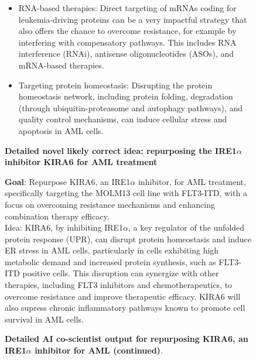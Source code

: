 \begin{figure}[htbp!]
\begin{tcolorbox}[
    colback=black!5!white,
    colframe=black!60!white,
    title=\textbf{KIRA6 for AML (continued)},
    fonttitle=\bfseries,
    arc=3mm,
    boxrule=1pt,
    bottomrule=2pt,
]
\begin{itemize}
    \item RNA-based therapies: Direct targeting of mRNAs coding for leukemia-driving proteins can be a very impactful strategy that also offers the chance to overcome resistance, for example by interfering with compensatory pathways. This includes RNA interference (RNAi), antisense oligonucleotides (ASOs), and mRNA-based therapies.
    \item Targeting protein homeostasis: Disrupting the protein homeostasis network, including protein folding, degradation (through ubiquitin-proteasome and autophagy pathways), and quality control mechanisms, can induce cellular stress and apoptosis in AML cells.
\end{itemize}

\textbf{Detailed novel likely correct idea: repurposing the IRE1$\alpha$ inhibitor KIRA6 for AML treatment\\}

\textbf{Goal}: Repurpose KIRA6, an IRE1$\alpha$ inhibitor, for AML treatment, specifically targeting the MOLM13 cell line with FLT3-ITD, with a focus on overcoming resistance mechanisms and enhancing combination therapy efficacy.
\\
Idea: KIRA6, by inhibiting IRE1$\alpha$, a key regulator of the unfolded protein response (UPR), can disrupt protein homeostasis and induce ER stress in AML cells, particularly in cells exhibiting high metabolic demand and increased protein synthesis, such as FLT3-ITD positive cells. This disruption can synergize with other therapies, including FLT3 inhibitors and chemotherapeutics, to overcome resistance and improve therapeutic efficacy. KIRA6 will also supress chronic inflammatory pathways known to promote cell survival in AML cells.

\end{tcolorbox}
\vspace{0.1cm}
\caption{\textbf{Detailed AI co-scientist output for repurposing KIRA6, an IRE1$\alpha$ inhibitor for AML (continued)}.}
\label{fig:ex_kira6_2}
\end{figure}


